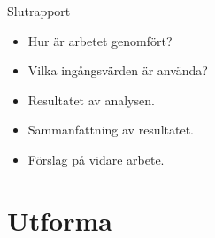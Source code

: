\documentclass{beamer}
\begin{document}
\begin{frame}{Slutrapport}
  \begin{itemize}
    \item Hur är arbetet genomfört?
    \item Vilka ingångsvärden är använda?
    \item Resultatet av analysen.
    \item Sammanfattning av resultatet.
    \item Förslag på vidare arbete.
  \end{itemize}
\end{frame}


\section{Utforma}
\end{document}

